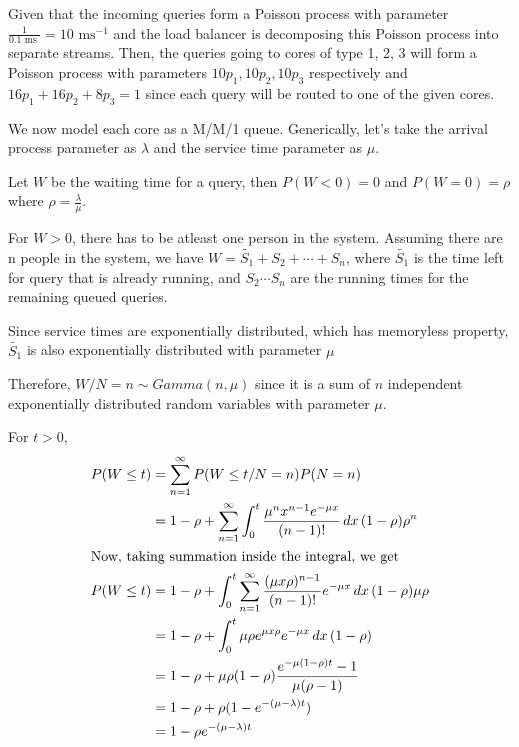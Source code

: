 \documentclass[12pt, oneside]{article}
\begin{document}
\begin{enumerate}
{    Given that the incoming queries form a Poisson process with parameter 
    \(\frac{1}{0.1 \text{ ms }} = 10 \text{ ms}^{-1}\) and the load balancer is decomposing
    this Poisson process into separate streams. Then, the queries going to cores of type
    1, 2, 3 will form a Poisson process with parameters \(10p_1, 10p_2, 10p_3\) respectively
    and \(16p_1 + 16p_2 + 8p_3 = 1\) since each query will be routed to one of the given
    cores.

    We now model each core as a M/M/1 queue. Generically, let's take the arrival process
    parameter as \(\lambda\) and the service time parameter as \(\mu\).

    Let \(W\) be the waiting time for a query, then \(P(W < 0) = 0\) and \(P(W = 0) = \rho\)
    where \(\rho = \frac{\lambda}{\mu}\).

    For \(W > 0\), there has to be atleast one person in the system. Assuming there are n
    people in the system, we have \(W = \widetilde{S_1} + S_2 + \cdots + S_n\), where 
    \(\widetilde{S_1}\) is the time left for query that is already running, and \(S_2 \cdots S_n\)
    are the running times for the remaining queued queries.

    Since service times are exponentially distributed, which has memoryless property,
    \(\widetilde{S_1}\) is also exponentially distributed with parameter \(\mu\)

    Therefore, \(W / N = n \sim Gamma(n, \mu)\)  since it is a sum of \(n\) independent
    exponentially distributed random variables with parameter \(\mu\).

    For \(t > 0\),
    \begin{align*}
        P(W \leq t) &= \sum_{n=1}^{\infty} P(W \leq t / N = n) P(N = n) \\
                    &= 1 - \rho + \sum_{n=1}^{\infty} \int_0^{t} \frac{\mu^n x^{n-1}e^{-\mu x}}{(n - 1)!}\,dx\,
                        (1 - \rho) \rho^n \\
        \intertext{Now, taking summation inside the integral, we get}
        P(W \leq t) &= 1 - \rho + \int_0^t \sum_{n=1}^{\infty} \frac{(\mu x \rho)^{n-1}}{(n - 1)!} e^{-\mu x}\,dx\,(1-\rho)\mu\rho \\
                    &= 1 - \rho + \int_0^t \mu \rho e^{\mu x \rho} e^{-\mu x} \,dx\, (1 -\rho) \\
                    &= 1 - \rho + \mu \rho (1 - \rho) \frac{e^{-\mu(1-\rho)t} - 1}{\mu(\rho - 1)} \\
                    &= 1 - \rho + \rho (1 - e^{-(\mu - \lambda)t}) \\
                    &= 1 - \rho e^{-(\mu - \lambda)t}
    \end{align*}

}
\end{enumerate}
\end{document}
